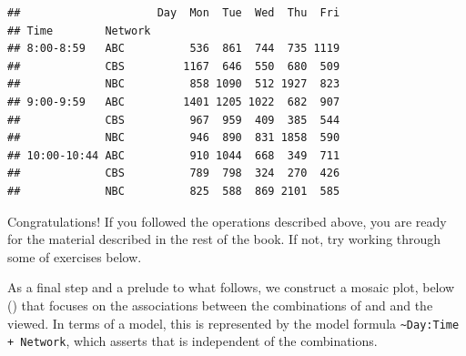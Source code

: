 \documentclass[11pt]{book}
\renewenvironment{knitrout}{\small\renewcommand{\baselinestretch}{.85}}{} %
\begin{document}
\begin{knitrout}
\color{fgcolor}\begin{kframe}
\begin{alltt}
 \hlkwb{<-} 
\hlopt{$} \hlkwb{<-} \hlstd{(}\hlstd{(}\hlstd{,}\hlstd{),}
                        \hlstd{(}\hlstd{,}\hlstd{),} \hlstd{(}\hlstd{,}\hlstd{))}
 \hlkwb{<-}  \hlopt{~}  \hlopt{+}  \hlopt{+} 
 \hlopt{~} \hlopt{+}
\end{alltt}
\begin{verbatim}
##                     Day  Mon  Tue  Wed  Thu  Fri
## Time        Network                             
## 8:00-8:59   ABC          536  861  744  735 1119
##             CBS         1167  646  550  680  509
##             NBC          858 1090  512 1927  823
## 9:00-9:59   ABC         1401 1205 1022  682  907
##             CBS          967  959  409  385  544
##             NBC          946  890  831 1858  590
## 10:00-10:44 ABC          910 1044  668  349  711
##             CBS          789  798  324  270  426
##             NBC          825  588  869 2101  585
\end{verbatim}
\end{kframe}
\end{knitrout}
Congratulations! If you followed the operations described above,
you are ready for the material described in the rest of the book.
If not, try working through some of exercises below.

As a final step and a prelude to what follows, we construct a mosaic
plot, below () that focuses on the associations
between the combinations of  and  and the
 viewed.  In terms of a \loglin model, this is
represented by the model formula \verb|~Day:Time + Network|,
which asserts that  is independent of the
 combinations.
\end{document}
